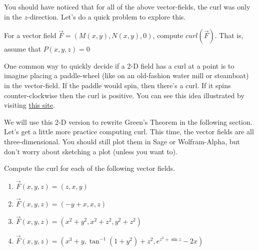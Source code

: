 You should have noticed that for all of the above vector-fields, the curl was only in the $z$-direction. Let's do a quick problem to explore this.

\begin{problem}\label{show2dcurl}
For a vector field $\vec{F}= ( M(x,y), N(x,y), 0 )$, compute $curl( \vec{F})$. That is, assume that $P(x,y,z)=0$
\end{problem}

One common way to quickly decide if a 2-D field has a curl at a point is to imagine placing a paddle-wheel (like on an old-fashion water mill or steamboat) in the vector-field. If the paddle would spin, then there's a curl. If it spins counter-clockwise then the curl is positive. You can see this idea illustrated by visiting \href{http://www.math.harvard.edu/~knill/pitf/2dcurldiv.html}{this site}.

We will use this 2-D version to rewrite Green's Theorem in the following section. Let's get a little more practice computing curl. This time, the vector fields are all three-dimensional. You should still plot them in Sage or Wolfram-Alpha, but don't worry about sketching a plot (unless you want to).
\begin{problem}\label{3dcurl}
Compute the curl for each of the following vector fields.
\begin{enumerate}
 \item $\vec F(x,y,z) = \left(z,x,y \right)$
 \item $\vec F(x,y,z) = \left(-y+x,x,z \right)$
 \item $\vec F(x,y,z) = \left(x^2+y^2,x^2+z^2,y^2+z^2 \right)$
 \item $\vec F(x,y,z) = \left(x^3+y,\tan^{-1}(1+y^2) + z^2,e^{z^2+\sin z} -2x\right)$
\end{enumerate}
\end{problem}




